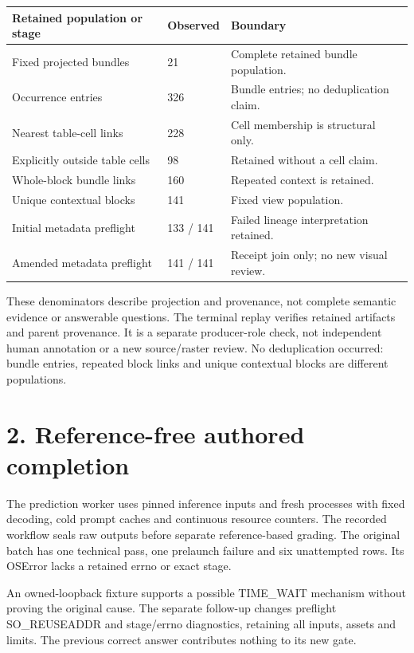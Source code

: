 \documentclass[10pt,a4paper]{article}
\begin{document}
\begin{longtable}{@{}p{}p{}p{}@{}}\toprule
\textbf{Retained population or stage} & \textbf{Observed} & \textbf{Boundary} \\ \midrule\endhead
Fixed projected bundles & 21 & Complete retained bundle population. \\
Occurrence entries & 326 & Bundle entries; no deduplication claim. \\
Nearest table-cell links & 228 & Cell membership is structural only. \\
Explicitly outside table cells & 98 & Retained without a cell claim. \\
Whole-block bundle links & 160 & Repeated context is retained. \\
Unique contextual blocks & 141 & Fixed view population. \\
Initial metadata preflight & 133 / 141 & Failed lineage interpretation retained. \\
Amended metadata preflight & 141 / 141 & Receipt join only; no new visual review. \\
\bottomrule\end{longtable}
{\small These denominators describe projection and provenance, not complete semantic evidence or answerable questions.}
The terminal replay verifies retained artifacts and parent provenance. It is a separate producer-role check, not independent human annotation or a new source/raster review. No deduplication occurred: bundle entries, repeated block links and unique contextual blocks are different populations.

\clearpage
\section*{2. Reference-free authored completion}
The prediction worker uses pinned inference inputs and fresh processes with fixed decoding, cold prompt caches and continuous resource counters. The recorded workflow seals raw outputs before separate reference-based grading. The original batch has one technical pass, one prelaunch failure and six unattempted rows. Its OSError lacks a retained errno or exact stage.

An owned-loopback fixture supports a possible TIME\_WAIT mechanism without proving the original cause. The separate follow-up changes preflight SO\_REUSEADDR and stage/errno diagnostics, retaining all inputs, assets and limits. The previous correct answer contributes nothing to its new gate.
\end{document}
